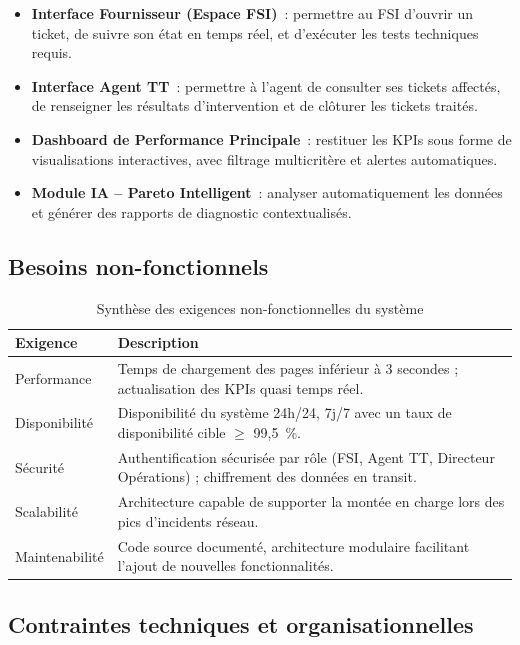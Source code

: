 \documentclass[11pt,a4paper]{report}
\begin{document}
\begin{itemize}
  \item \textbf{Interface Fournisseur (Espace FSI)}~: permettre au FSI d'ouvrir un ticket, de suivre son état en temps réel, et d'exécuter les tests techniques requis.
  \item \textbf{Interface Agent TT}~: permettre à l'agent de consulter ses tickets affectés, de renseigner les résultats d'intervention et de clôturer les tickets traités.
  \item \textbf{Dashboard de Performance Principale}~: restituer les KPIs sous forme de visualisations interactives, avec filtrage multicritère et alertes automatiques.
  \item \textbf{Module IA -- Pareto Intelligent}~: analyser automatiquement les données et générer des rapports de diagnostic contextualisés.
\end{itemize}

\subsection{Besoins non-fonctionnels}

\begin{table}[h!]
\centering
\caption{Synthèse des exigences non-fonctionnelles du système}
\begin{tabularx}{\textwidth}{L{3.5cm} X}
\toprule
\textbf{Exigence} & \textbf{Description} \\
\midrule
Performance    & Temps de chargement des pages inférieur à 3 secondes ; actualisation des KPIs quasi temps réel. \\
Disponibilité  & Disponibilité du système 24h/24, 7j/7 avec un taux de disponibilité cible $\geq$ 99,5~\%. \\
Sécurité       & Authentification sécurisée par rôle (FSI, Agent TT, Directeur Opérations) ; chiffrement des données en transit. \\
Scalabilité    & Architecture capable de supporter la montée en charge lors des pics d'incidents réseau. \\
Maintenabilité & Code source documenté, architecture modulaire facilitant l'ajout de nouvelles fonctionnalités. \\
\bottomrule
\end{tabularx}
\label{tab:nonfunc}
\end{table}

\subsection{Contraintes techniques et organisationnelles}
\end{document}
